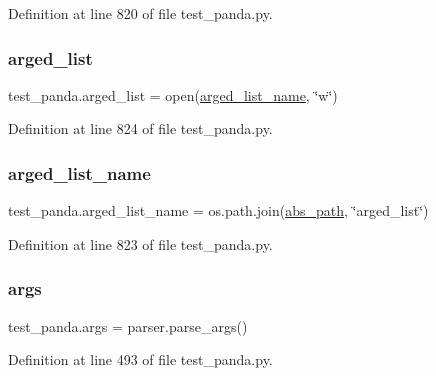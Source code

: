 Definition at line 820 of file test\+\_\+panda.\+py.

\mbox{\label{namespacetest__panda_a8b03b0fb1390a5d88cdff029605940b4}} 
\subsubsection{\texorpdfstring{arged\+\_\+list}{arged\_list}}
{\footnotesize\ttfamily test\+\_\+panda.\+arged\+\_\+list = open(\hyperlink{namespacetest__panda_a86167c53a37ca31bb5d2793a6a74a8e3}{arged\+\_\+list\+\_\+name}, \char`\"{}w\char`\"{})}



Definition at line 824 of file test\+\_\+panda.\+py.

\mbox{\label{namespacetest__panda_a86167c53a37ca31bb5d2793a6a74a8e3}} 
\subsubsection{\texorpdfstring{arged\+\_\+list\+\_\+name}{arged\_list\_name}}
{\footnotesize\ttfamily test\+\_\+panda.\+arged\+\_\+list\+\_\+name = os.\+path.\+join(\hyperlink{namespacetest__panda_a78bb23566d04ac65a03195681449d2c0}{abs\+\_\+path}, \char`\"{}arged\+\_\+list\char`\"{})}



Definition at line 823 of file test\+\_\+panda.\+py.

\mbox{\label{namespacetest__panda_aaa97e5cb55582d83d04e62d4a024c9e8}} 
\subsubsection{\texorpdfstring{args}{args}}
{\footnotesize\ttfamily test\+\_\+panda.\+args = parser.\+parse\+\_\+args()}



Definition at line 493 of file test\+\_\+panda.\+py.



